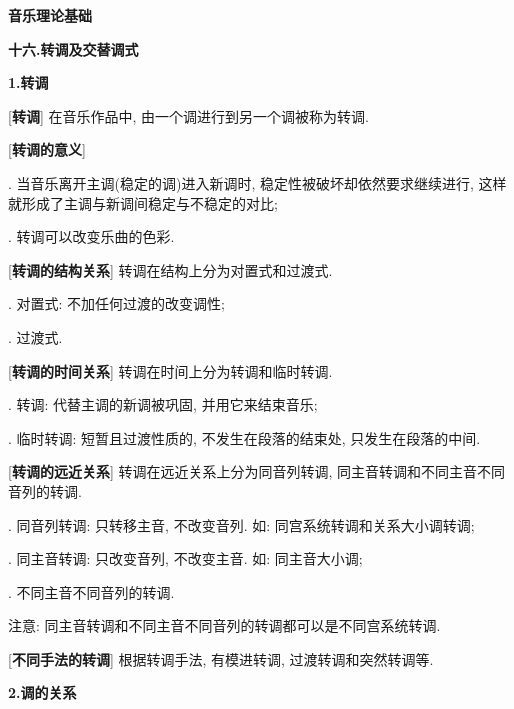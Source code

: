 

\begin{center} 
 \Large \textbf{音乐理论基础}\par
 \textbf{十六.转调及交替调式}
\end{center}

\large 
\begin{center}
 \textbf{1.转调}\\
\end{center}

[\textbf{转调}] 在音乐作品中, 由一个调进行到另一个调被称为转调.\par

[\textbf{转调的意义}]\par
{}. 当音乐离开主调(稳定的调)进入新调时, 稳定性被破坏却依然要求继续进行, 这样就形成了主调与新调间稳定与不稳定的对比;\par
{}. 转调可以改变乐曲的色彩.\par

[\textbf{转调的结构关系}] 转调在结构上分为对置式和过渡式.\par
{}. 对置式: 不加任何过渡的改变调性;\par
{}. 过渡式.\par

[\textbf{转调的时间关系}] 转调在时间上分为转调和临时转调.\par
{}. 转调: 代替主调的新调被巩固, 并用它来结束音乐;\par
{}. 临时转调: 短暂且过渡性质的, 不发生在段落的结束处, 只发生在段落的中间.\par

[\textbf{转调的远近关系}] 转调在远近关系上分为同音列转调, 同主音转调和不同主音不同音列的转调.\par
{}. 同音列转调: 只转移主音, 不改变音列. 如: 同宫系统转调和关系大小调转调;\par
{}. 同主音转调: 只改变音列, 不改变主音. 如: 同主音大小调;\par
{}. 不同主音不同音列的转调.\par
\qquad 注意: 同主音转调和不同主音不同音列的转调都可以是不同宫系统转调.\par

[\textbf{不同手法的转调}] 根据转调手法, 有模进转调, 过渡转调和突然转调等.\par

\begin{center}
 \textbf{2.调的关系}\\
\end{center}

